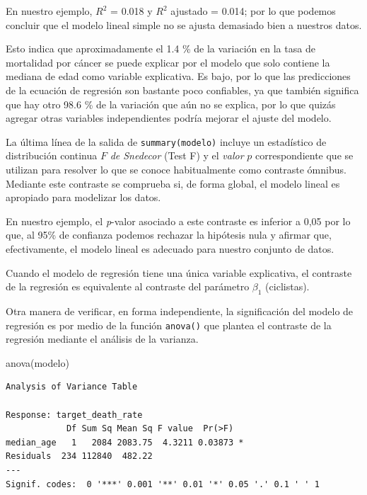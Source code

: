 \documentclass[
  letterpaper,
  DIV=11,
  numbers=noendperiod]{scrartcl}
\newenvironment{Shaded}{\begin{snugshade}}{\end{snugshade}}
\newcommand{\FunctionTok}[1]{\textcolor[rgb]{0.28,0.35,0.67}{#1}}
\newcommand{\NormalTok}[1]{\textcolor[rgb]{0.00,0.23,0.31}{#1}}
\begin{document}
En nuestro ejemplo, \(R^2\) = 0.018 y \(R^2\) ajustado = 0.014; por lo
que podemos concluir que el modelo lineal simple no se ajusta demasiado
bien a nuestros datos.

Esto indica que aproximadamente el 1.4 \% de la variación en la tasa de
mortalidad por cáncer se puede explicar por el modelo que solo contiene
la mediana de edad como variable explicativa. Es bajo, por lo que las
predicciones de la ecuación de regresión son bastante poco confiables,
ya que también significa que hay otro 98.6 \% de la variación que aún no
se explica, por lo que quizás agregar otras variables independientes
podría mejorar el ajuste del modelo.

La última línea de la salida de \texttt{summary(modelo)} incluye un
estadístico de distribución continua \(F\) \emph{de Snedecor} (Test F) y
el \emph{valor} \(p\) correspondiente que se utilizan para resolver lo
que se conoce habitualmente como contraste ómnibus. Mediante este
contraste se comprueba si, de forma global, el modelo lineal es
apropiado para modelizar los datos.

En nuestro ejemplo, el \emph{p}-valor asociado a este contraste es
inferior a 0,05 por lo que, al 95\% de confianza podemos rechazar la
hipótesis nula y afirmar que, efectivamente, el modelo lineal es
adecuado para nuestro conjunto de datos.

Cuando el modelo de regresión tiene una única variable explicativa, el
contraste de la regresión es equivalente al contraste del parámetro
\(\beta_1\) (ciclistas).

Otra manera de verificar, en forma independiente, la significación del
modelo de regresión es por medio de la función \texttt{anova()} que
plantea el contraste de la regresión mediante el análisis de la
varianza.

\begin{Shaded}
\begin{Highlighting}[]
\FunctionTok{anova}\NormalTok{(modelo)}
\end{Highlighting}
\end{Shaded}

\begin{verbatim}
Analysis of Variance Table

Response: target_death_rate
            Df Sum Sq Mean Sq F value  Pr(>F)  
median_age   1   2084 2083.75  4.3211 0.03873 *
Residuals  234 112840  482.22                  
---
Signif. codes:  0 '***' 0.001 '**' 0.01 '*' 0.05 '.' 0.1 ' ' 1
\end{verbatim}
\end{document}
